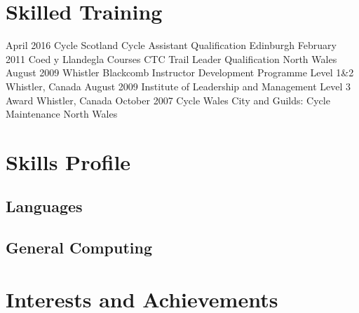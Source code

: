 \documentclass{moderncv}
\begin{document}
\section{Skilled Training}
	\cventry
		{}
		{April 2016}
		{Cycle Scotland}
		{Cycle Assistant Qualification}
		{Edinburgh}
		{}
	\cventry
		{}
		{February 2011}
		{Coed y Llandegla Courses}
		{CTC Trail Leader Qualification}
		{North Wales}
		{}
	\cventry
		{}
		{August 2009}
		{Whistler Blackcomb}
		{Instructor Development Programme Level 1\&2}
		{Whistler, Canada}
		{}
	\cventry
		{}
		{August 2009}
		{Institute of Leadership and Management}
		{Level 3 Award}
		{Whistler, Canada}
		{}
	\cventry
		{}
		{October 2007}
		{Cycle Wales}
		{City and Guilds: Cycle Maintenance}
		{North Wales}
		{}
\section{Skills Profile}
\subsection{\bfseries Languages}
\subsection{\bfseries General Computing}
\section{Interests and Achievements}
\end{document}
